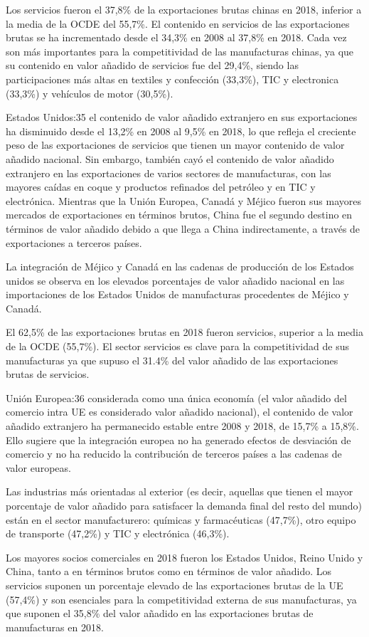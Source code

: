 \documentclass[10pt,a4paper]{article}
\begin{document}
{Los servicios fueron el 37,8\% de la exportaciones brutas chinas en 2018, inferior a la media de la OCDE del 55,7\%. El contenido en servicios de las exportaciones brutas se ha incrementado desde el 34,3\% en 2008 al 37,8\% en 2018. Cada vez son más importantes para la competitividad de las manufacturas chinas, ya que su contenido en valor añadido de servicios fue del 29,4\%, siendo las participaciones más altas en textiles y confección (33,3\%), TIC y electronica (33,3\%) y vehículos de motor (30,5\%).

Estados Unidos:35 el contenido de valor añadido extranjero en sus exportaciones ha disminuido desde el 13,2\% en 2008 al 9,5\% en 2018, lo que refleja el creciente peso de las exportaciones de servicios que tienen un mayor contenido de valor añadido nacional. Sin embargo, también cayó el contenido de valor añadido extranjero en las exportaciones de varios sectores de manufacturas, con las mayores caídas en coque y productos refinados del petróleo y en TIC y electrónica. Mientras que la Unión Europea, Canadá y Méjico fueron sus mayores mercados de exportaciones en términos brutos, China fue el segundo destino en términos de valor añadido debido a que llega a China indirectamente, a través de exportaciones a terceros países.

La integración de Méjico y Canadá en las cadenas de producción de los Estados unidos se observa en los elevados porcentajes de valor añadido nacional en las importaciones de los Estados Unidos de manufacturas procedentes de Méjico y Canadá.

El 62,5\% de las exportaciones brutas en 2018 fueron servicios, superior a la media de la OCDE (55,7\%). El sector servicios es clave para la competitividad de sus manufacturas ya que supuso el 31.4\% del valor añadido de las exportaciones brutas de servicios.

Unión Europea:36 considerada como una única economía (el valor añadido del comercio intra UE es considerado valor añadido nacional), el contenido de valor añadido extranjero ha permanecido estable entre 2008 y 2018, de 15,7\% a 15,8\%. Ello sugiere que la integración europea no ha generado efectos de desviación de comercio y no ha reducido la contribución de terceros países a las cadenas de valor europeas. 

Las industrias más orientadas al exterior (es decir, aquellas que tienen el mayor porcentaje de valor añadido para satisfacer la demanda final del resto del mundo) están en el sector manufacturero: químicas y farmacéuticas (47,7\%), otro equipo de transporte (47,2\%) y TIC y
electrónica (46,3\%).

Los mayores socios comerciales en 2018 fueron los Estados Unidos, Reino Unido y China, tanto a en términos brutos como en términos de valor añadido. Los servicios suponen un porcentaje elevado de las exportaciones brutas de la UE (57,4\%) y son esenciales para la competitividad externa de sus manufacturas, ya que suponen el 35,8\% del valor añadido en las exportaciones brutas de manufacturas en 2018.
}
\end{document}
